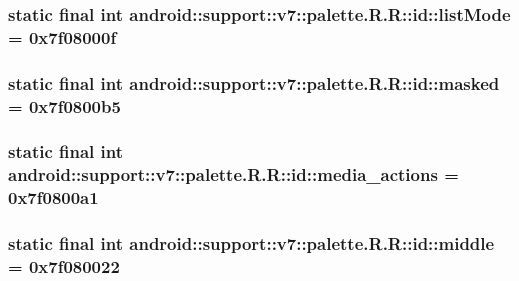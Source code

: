 \hypertarget{classandroid_1_1support_1_1v7_1_1palette_1_1_r_1_1id_7a3f6edad82ac6c006eaee649b9b1ccf}{
\subsubsection[{listMode}]{\setlength{\rightskip}{0pt plus 5cm}static final int android::support::v7::palette.R.R::id::listMode = 0x7f08000f}}
\label{classandroid_1_1support_1_1v7_1_1palette_1_1_r_1_1id_7a3f6edad82ac6c006eaee649b9b1ccf}


\hypertarget{classandroid_1_1support_1_1v7_1_1palette_1_1_r_1_1id_bc0b4e25772bf83fbaab7c94d46c2b7c}{
\subsubsection[{masked}]{\setlength{\rightskip}{0pt plus 5cm}static final int android::support::v7::palette.R.R::id::masked = 0x7f0800b5}}
\label{classandroid_1_1support_1_1v7_1_1palette_1_1_r_1_1id_bc0b4e25772bf83fbaab7c94d46c2b7c}


\hypertarget{classandroid_1_1support_1_1v7_1_1palette_1_1_r_1_1id_3d59c2458436862b825115f2c4ee1710}{
\subsubsection[{media\_\-actions}]{\setlength{\rightskip}{0pt plus 5cm}static final int android::support::v7::palette.R.R::id::media\_\-actions = 0x7f0800a1}}
\label{classandroid_1_1support_1_1v7_1_1palette_1_1_r_1_1id_3d59c2458436862b825115f2c4ee1710}


\hypertarget{classandroid_1_1support_1_1v7_1_1palette_1_1_r_1_1id_65b7eb7c6f5d916d041eaf569994b883}{
\subsubsection[{middle}]{\setlength{\rightskip}{0pt plus 5cm}static final int android::support::v7::palette.R.R::id::middle = 0x7f080022}}
\label{classandroid_1_1support_1_1v7_1_1palette_1_1_r_1_1id_65b7eb7c6f5d916d041eaf569994b883}


